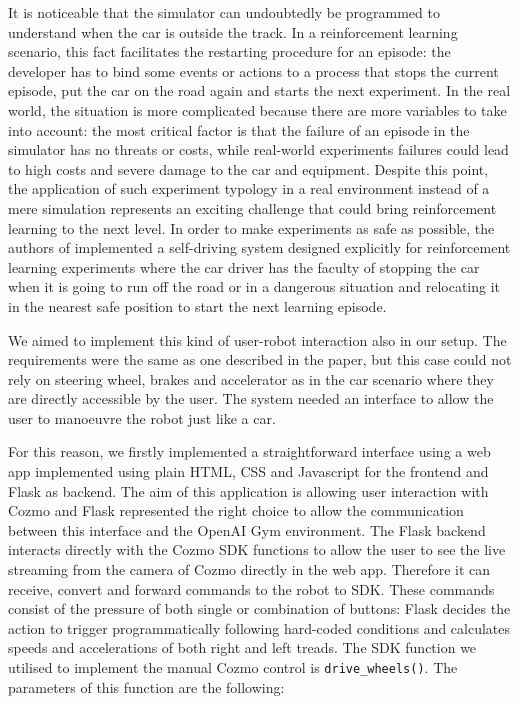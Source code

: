 It is noticeable that the simulator can undoubtedly be programmed to understand when the car is outside the track. In a reinforcement learning scenario, this fact facilitates the restarting procedure for an episode: the developer has to bind some events or actions to a process that stops the current episode, put the car on the road again and starts the next experiment. In the real world, the situation is more complicated because there are more variables to take into account: the most critical factor is that the failure of an episode in the simulator has no threats or costs, while real-world experiments failures could lead to high costs and severe damage to the car and equipment. Despite this point, the application of such experiment typology in a real environment instead of a mere simulation represents an exciting challenge that could bring reinforcement learning to the next level. In order to make experiments as safe as possible, the authors of \cite{kendall2018learning,kendall2019learning} implemented a self-driving system designed explicitly for reinforcement learning experiments where the car driver has the faculty of stopping the car when it is going to run off the road or in a dangerous situation and relocating it in the nearest safe position to start the next learning episode.

We aimed to implement this kind of user-robot interaction also in our setup. The requirements were the same as one described in the paper, but this case could not rely on steering wheel, brakes and accelerator as in the car scenario where they are directly accessible by the user. The system needed an interface to allow the user to manoeuvre the robot just like a car.

For this reason, we firstly implemented a straightforward interface using a web app implemented using plain HTML, CSS and Javascript for the frontend and Flask as backend. The aim of this application is allowing user interaction with Cozmo and Flask represented the right choice to allow the communication between this interface and the OpenAI Gym environment. The Flask backend interacts directly with the Cozmo SDK functions to allow the user to see the live streaming from the camera of Cozmo directly in the web app. Therefore it can receive, convert and forward commands to the robot to SDK. These commands consist of the pressure of both single or combination of buttons: Flask decides the action to trigger programmatically following hard-coded conditions and calculates speeds and accelerations of both right and left treads. The SDK function we utilised to implement the manual Cozmo control is \texttt{drive\_wheels()}. The parameters of this function are the following:

